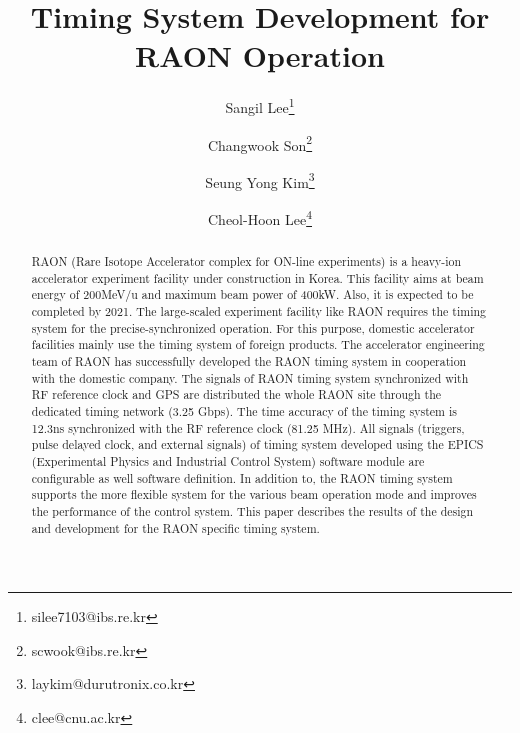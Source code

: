 \documentclass[journal,reqno]{IEEEtran}
\begin{document}
\title{
	\textbf{Timing System Development for RAON Operation} %
	\vspace{0.5cm}
	\Large
}
\author[1]{Sangil Lee\thanks{silee7103@ibs.re.kr}}
\author[2]{Changwook Son\thanks{scwook@ibs.re.kr}}
\author[3]{Seung Yong Kim\thanks{laykim@durutronix.co.kr}}
\author[4]{Cheol-Hoon Lee\thanks{clee@cnu.ac.kr}}
\date{}
\maketitle
\vspace{2em}

\begin{abstract}
RAON (Rare Isotope Accelerator complex for ON-line experiments) is a heavy-ion accelerator experiment facility under construction in Korea. This facility aims at beam energy of 200MeV/u and maximum beam power of 400kW. Also, it is expected to be completed by 2021. The large-scaled experiment facility like RAON requires the timing system for the precise-synchronized operation. For this purpose, domestic accelerator facilities mainly use the timing system of foreign products. The accelerator engineering team of RAON has successfully developed the RAON timing system in cooperation with the domestic company. The signals of RAON timing system synchronized with RF reference clock and GPS are distributed the whole RAON site through the dedicated timing network (3.25 Gbps). The time accuracy of the timing system is 12.3ns synchronized with the RF reference clock (81.25 MHz). All signals (triggers, pulse delayed clock, and external signals) of timing system developed using the EPICS (Experimental Physics and Industrial Control System) software module are configurable as well software definition. In addition to, the RAON timing system supports the more flexible system for the various beam operation mode and improves the performance of the control system. \newline
This paper describes the results of the design and development for the RAON specific timing system.
\end{abstract}

\end{document}
